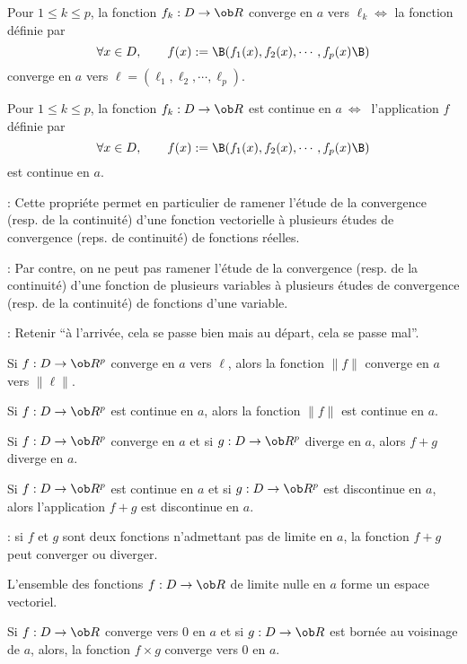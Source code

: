 Pour $1\le k\le p$, la fonction $f_k:D\to\ob R$ converge en $a$ vers $\ell_k \Longleftrightarrow$ la fonction définie par 
$$
\forall x\in D, \qquad f(x):=\B(f_1(x),f_2(x),\cdots,f_p(x)\B)
$$
converge en $a$ vers $\ell=(\ell_1,\ell_2,\cdots,\ell_p)$. 

\Invertedtrue
\Theoreme [$a\in D\subset\ob R^n$] 
Pour $1\le k\le p$, la fonction $f_k:D\to\ob R$ est continue en $a\ \Longleftrightarrow\ $ l'application $f$ définie par 
$$
\forall x\in D, \qquad f(x):=\B(f_1(x),f_2(x),\cdots,f_p(x)\B)
$$
est continue en $a$. \pn

\Remarque : Cette propriéte permet en particulier de ramener l'étude de la convergence (resp. de la continuité) d'une fonction vectorielle à plusieurs études de convergence (reps. de continuité) de fonctions réelles. 
\bigskip

\Remarque : Par contre, on ne peut pas ramener l'étude de la convergence (resp. de la continuité) d'une fonction de plusieurs variables à plusieurs études de convergence (resp. de la continuité) de fonctions d'une variable. 
\bigskip

\Remarque : Retenir ``à l'arrivée, cela se passe bien mais au départ, cela se passe mal''. 


Si $f:D\to\ob R^p$ converge en $a$ vers $\ell$, alors la fonction $\|f\|$ converge en $a$ vers $\|\ell\|$. 

\Invertedtrue
{} 
Si $f:D\to\ob R^p$ est continue en $a$, alors la fonction $\|f\|$ est continue en $a$. \pn


\Propriete [$D\subset\ob R^n$, $a\in\ob R^n$]
Si $f:D\to\ob R^p$ converge en $a$ et si $g:D\to\ob R^p$ diverge en $a$, alors $f+g$ diverge en $a$. 

\Invertedtrue
\Propriete [$D\subset\ob R^n$]
Si $f:D\to\ob R^p$ est continue en $a$ et si $g:D\to\ob R^p$ est discontinue en $a$, alors l'application $f+g$ est discontinue en $a$. \pn

\Remarque : si $f$ et $g$ sont deux fonctions n'admettant pas de limite en $a$, la fonction $f+g$ peut converger ou diverger. 
\bigskip


\Propriete [$D$ voisinage de $a\in\ob R^n$] 
L'ensemble des fonctions $f:D\to\ob R$ de limite nulle en $a$ forme un espace vectoriel. 

\Propriete [$D\subset\ob R^n$] 
Si $f:D\to\ob R$ converge vers $0$ en $a$ et si $g:D\to\ob R$ est bornée au voisinage de $a$, alors, la fonction $f\times g$ converge vers $0$ en $a$.

